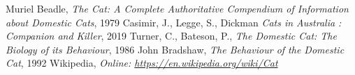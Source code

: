 \documentclass{article}
\begin{document}
\printnoidxglossary[style=listdotted]

\begin{thebibliography}{8}
     Muriel Beadle, \emph{The Cat: A Complete Authoritative Compendium of Information about Domestic Cats}, 1979
     Casimir, J., Legge, S., Dickman \emph{Cats in Australia : Companion and Killer}, 2019
     Turner, C., Bateson, P., \emph{The Domestic Cat: The Biology of its Behaviour}, 1986
     John Bradshaw, \emph{The Behaviour of the Domestic Cat}, 1992
     Wikipedia, \emph{Online: \url{https://en.wikipedia.org/wiki/Cat}}
\end{thebibliography}


\end{document}
